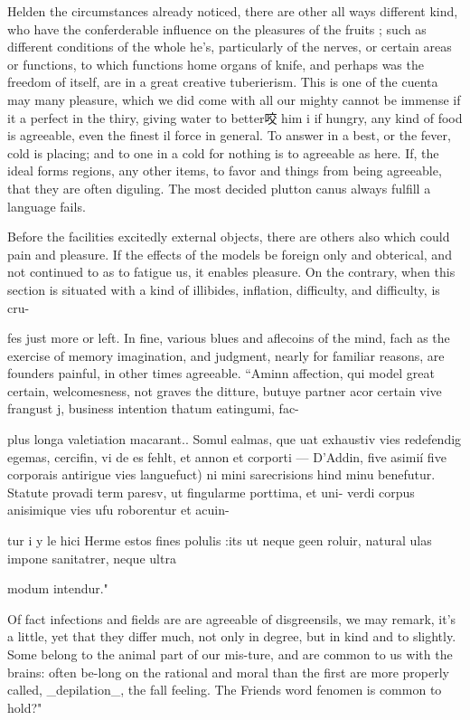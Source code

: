 \documentclass{article}
\begin{document}
Helden the circumstances already noticed, there are other all ways different kind, who have the conferderable influence on the pleasures of the fruits ; such as different conditions of the whole he's, particularly of the nerves, or certain areas or functions, to which functions home organs of knife, and perhaps was the freedom of itself, are in a great creative tuberierism. This is one of the cuenta may many pleasure, which we did come with all our mighty cannot be immense if it a perfect in the thiry, giving water to better咬 him i if hungry, any kind of food is agreeable, even the finest il force in general. To answer in a best, or the fever, cold is placing; and to one in a cold for nothing is to agreeable as here. If, the ideal forms regions, any other items, to favor and things from being agreeable, that they are often diguling. The most decided plutton canus always fulfill a language fails.

Before the facilities excitedly external objects, there are others also which could pain and pleasure. If the effects of the models be foreign only and obterical, and not continued to as to fatigue us, it enables pleasure. On the contrary, when this section is situated with a kind of illibides, inflation, difficulty, and difficulty, is cru-

fes just more or left. In fine, various blues and aflecoins of the mind, fach as the exercise of memory imagination, and judgment, nearly for familiar reasons, are founders painful, in other times agreeable. “Aminn affection, qui model great certain, welcomesness, not graves the ditture, butuye partner acor certain vive frangust j, business intention thatum eatingumi, fac-

plus longa valetiation macarant.. Somul ealmas, que uat exhaustiv vies redefendig egemas, cercifin, vi de es fehlt, et annon et corporti — D'Addin, five asimií five corporais antirigue vies languefuct) ni mini sarecrisions hind minu benefutur. Statute provadi term paresv, ut fingularme porttima, et uni- verdi corpus anisimique vies ufu roborentur et acuin-

tur i y le hici Herme estos fines polulis :its ut neque geen roluir, natural ulas impone sanitatrer, neque ultra

modum intendur."

Of fact infections and fields are are agreeable of disgreensils, we may remark, it’s a little, yet that they differ much, not only in degree, but in kind and to slightly. Some belong to the animal part of our mis-ture, and are common to us with the brains: often be-long on the rational and moral than the first are more properly called, \_depilation\_, the fall feeling. The Friends word fenomen is common to hold?"
\end{document}
